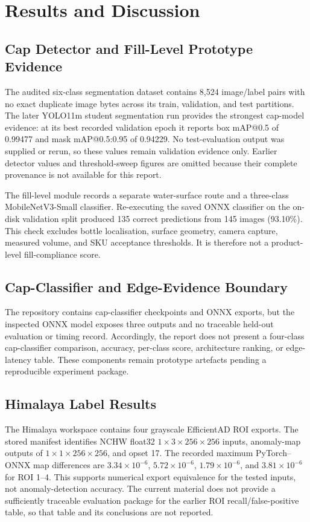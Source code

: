 \documentclass[12pt,a4paper]{report}
\begin{document}
\chapter{Results and Discussion}
\section{Cap Detector and Fill-Level Prototype Evidence}
The audited six-class segmentation dataset contains 8,524 image/label pairs with no exact duplicate image bytes across its train, validation, and test partitions. The later YOLO11m student segmentation run provides the strongest cap-model evidence: at its best recorded validation epoch it reports box mAP@0.5 of 0.99477 and mask mAP@0.5:0.95 of 0.94229. No test-evaluation output was supplied or rerun, so these values remain validation evidence only. Earlier detector values and threshold-sweep figures are omitted because their complete provenance is not available for this report.

The fill-level module records a separate water-surface route and a three-class MobileNetV3-Small classifier. Re-executing the saved ONNX classifier on the on-disk validation split produced 135 correct predictions from 145 images (93.10\%). This check excludes bottle localisation, surface geometry, camera capture, measured volume, and SKU acceptance thresholds. It is therefore not a product-level fill-compliance score.

\section{Cap-Classifier and Edge-Evidence Boundary}
The repository contains cap-classifier checkpoints and ONNX exports, but the inspected ONNX model exposes three outputs and no traceable held-out evaluation or timing record. Accordingly, the report does not present a four-class cap-classifier comparison, accuracy, per-class score, architecture ranking, or edge-latency table. These components remain prototype artefacts pending a reproducible experiment package.

\section{Himalaya Label Results}
The Himalaya workspace contains four grayscale EfficientAD ROI exports. The stored manifest identifies NCHW float32 $1\times3\times256\times256$ inputs, anomaly-map outputs of $1\times1\times256\times256$, and opset 17. The recorded maximum PyTorch--ONNX map differences are $3.34\times10^{-6}$, $5.72\times10^{-6}$, $1.79\times10^{-6}$, and $3.81\times10^{-6}$ for ROI 1--4. This supports numerical export equivalence for the tested inputs, not anomaly-detection accuracy. The current material does not provide a sufficiently traceable evaluation package for the earlier ROI recall/false-positive table, so that table and its conclusions are not reported.
\end{document}
